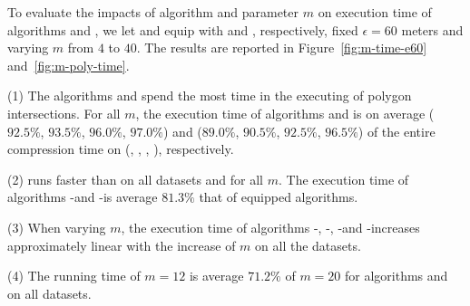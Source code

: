 To evaluate the impacts of algorithm \rpia and parameter $m$ on execution time of algorithms \cist and \cista, we 
let \cist and \cista equip with \rpia and \cpia, respectively, fixed $\epsilon =60$ meters and varying $m$ from $4$ to $40$.
%
The results are reported in Figure~\ref{fig:m-time-e60} and~\ref{fig:m-poly-time}.

\ni(1) The algorithms \cist and \cista spend the most time in the executing of polygon intersections. For all $m$, the execution time of algorithms \cpia and \rpia is on average ($92.5\%$, $93.5\%$, $96.0\%$, $97.0\%$) and ($89.0\%$, $90.5\%$, $92.5\%$, $96.5\%$) of the entire compression time on (\truck, \sercar, \geolife, \pricar), respectively.

\ni(2) \rpia runs faster than \cpia on all datasets and for all $m$. The execution time of algorithms \cist-\rpia and \cista-\rpia is average $81.3\%$ that of \cpia equipped algorithms.

\ni(3) When varying $m$, the execution time of algorithms \cist-\rpia, \cist-\cpia, \cista-\rpia and \cista-\cpia increases approximately linear with the increase of $m$ on all the datasets.

\ni(4) The running time of $m=12$ is average {$71.2\%$} of $m=20$ for algorithms \cist and \cista on all datasets.






